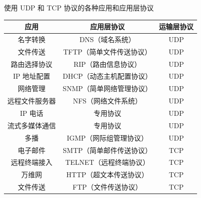 \documentclass[cs4size,a4paper,10pt]{ctexart}
\begin{document}
	使用 UDP 和 TCP 协议的各种应用和应用层协议
	\begin{table}[H]
		\centering
		\begin{tabular}{|c|c|c|}
		\hline
		应用      & 应用层协议          & 运输层协议 \\ \hline
		名字转换    & DNS（域名系统）      & UDP   \\ \hline
		文件传送    & TFTP（简单文件传送协议） & UDP   \\ \hline
		路由选择协议  & RIP（路由信息协议）    & UDP   \\ \hline
		IP 地址配置 & DHCP（动态主机配置协议） & UDP   \\ \hline
		网络管理    & SNMP（简单网络管理协议） & UDP   \\ \hline
		远程文件服务器 & NFS（网络文件系统）    & UDP   \\ \hline
		IP 电话   & 专用协议           & UDP   \\ \hline
		流式多媒体通信 & 专用协议           & UDP   \\ \hline
		多播      & IGMP（网际组管理协议）  & UDP   \\ \hline
		电子邮件    & SMTP（简单邮件传送协议） & TCP   \\ \hline
		远程终端接入  & TELNET（远程终端协议） & TCP   \\ \hline
		万维网     & HTTP（超文本传送协议）  & TCP   \\ \hline
		文件传送    & FTP（文件传送协议）    & TCP   \\ \hline
		\end{tabular}
	\end{table}
\end{document}
